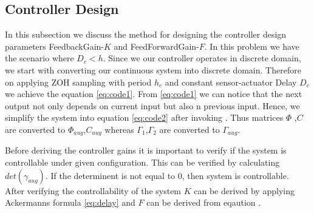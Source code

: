 \subsection{Controller Design}
In this subsection we discuss the method for designing the controller design parameters FeedbackGain-$K$ and FeedForwardGain-$F$. In this problem we have the scenario where $D_c<h$. Since we our controller operates in discrete domain, we start with converting our continuous system into discrete domain. Therefore on applying ZOH sampling with period $h_c$ and constant sensor-actuator Delay $D_c$ we achieve the equation \ref{eq:code1}. From \ref{eq:code1} we can notice that the next output not only depends on current input but also n previous input. Hence, we simplify the system into equation \ref{eq:code2} after invoking .
Thus matrices $\Phi$ ,$C$ are converted to $\Phi_{aug}$,$C_{aug}$ whereas $\Gamma_1$,$\Gamma_2$ are converted to $\Gamma_{aug}$.

  Before deriving the controller gains it is important to verify if the system is controllable under given configuration. This can be verified by calculating $det(\gamma_{aug})$. If the determinent is not equal to 0, then system is controllable. After verifying the controllability of the system $K$ can be derived by applying Ackermanns formula \ref{eq:delay} and $F$ can be derived from eqaution .